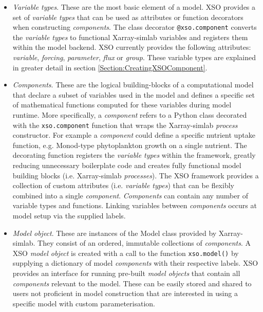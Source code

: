 \documentclass[journal abbreviation, manuscript]{copernicus}
\begin{document}
\begin{itemize}
    \item  \textit{Variable types}. These are the most basic element of a model. XSO provides a set of \textit{variable types} that can be used as attributes or function decorators when constructing \textit{components}. The class decorator \texttt{@xso.component} converts the \textit{variable types} to functional Xarray-simlab variables and registers them within the model backend. XSO currently provides the following attributes: \textit{variable}, \textit{forcing}, \textit{parameter}, \textit{flux} or \textit{group}. These variable types are explained in greater detail in section \ref{Section:CreatingXSOComponent}.
    
    \item \textit{Components}. These are the logical building-blocks of a computational model that declare a subset of variables used in the model and defines a specific set of mathematical functions computed for these variables during model runtime. More specifically, a \textit{component} refers to a Python class decorated with the \texttt{xso.component} function that wraps the Xarray-simlab \textit{process} constructor. For example a \textit{component} could define a specific nutrient uptake function, e.g. Monod-type phytoplankton growth on a single nutrient. The decorating function registers the \textit{variable types} within the framework, greatly reducing unnecessary boilerplate code and creates fully functional model building blocks (i.e. Xarray-simlab \textit{processes}). The XSO framework provides a collection of custom attributes (i.e. \textit{variable types}) that can be flexibly combined into a single \textit{component}. \textit{Components} can contain any number of variable types and functions. Linking variables between \textit{components} occurs at model setup via the supplied labels.
    
    \item \textit{Model object}. These are instances of the Model class provided by Xarray-simlab. They consist of an ordered, immutable collections of \textit{components}. A XSO \textit{model object} is created with a call to the function \texttt{xso.model()} by supplying a dictionary of model \textit{components} with their respective labels. XSO provides an interface for running pre-built \textit{model objects} that contain all \textit{components} relevant to the model. These can be easily stored and shared to users not proficient in model construction that are interested in using a specific model with custom parameterisation.
    

\end{itemize}
\end{document}
